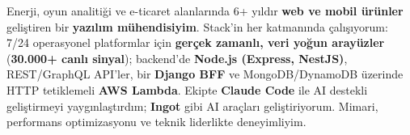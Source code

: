 
\begin{cvparagraph}

Enerji, oyun analitiği ve e-ticaret alanlarında 6+ yıldır \textbf{web ve mobil ürünler} geliştiren bir \textbf{yazılım mühendisiyim}. Stack'in her katmanında çalışıyorum: 7/24 operasyonel platformlar için \textbf{gerçek zamanlı, veri yoğun arayüzler} (\textbf{30.000+ canlı sinyal}); backend'de \textbf{Node.js (Express, NestJS)}, REST/GraphQL API'ler, bir \textbf{Django BFF} ve MongoDB/DynamoDB üzerinde HTTP tetiklemeli \textbf{AWS Lambda}. Ekipte \textbf{Claude Code} ile AI destekli geliştirmeyi yaygınlaştırdım; \textbf{Ingot} gibi AI araçları geliştiriyorum. Mimari, performans optimizasyonu ve teknik liderlikte deneyimliyim.

\end{cvparagraph}
